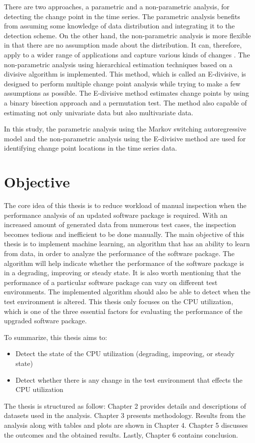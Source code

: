 There are two approaches, a parametric and a non-parametric analysis,
for detecting the change point in the time series. The parametric
analysis benefits from assuming some knowledge of data distribution
and integrating it to the detection scheme. On the other hand, the
non-parametric analysis is more flexible in that there are no assumption
made about the distribution. It can, therefore, apply to a wider range
of applications and capture various kinds of changes \citep{sharkey2014nonparametric}.
The non-parametric analysis using hierarchical estimation techniques
based on a divisive algorithm is implemented. This method, which is
called an E-divisive, is designed to perform multiple change point
analysis while trying to make a few assumptions as possible. The E-divisive
method estimates change points by using a binary bisection approach
and a permutation test. The method also capable of estimating not
only univariate data but also multivariate data. 

In this study, the parametric analysis using the Markov switching
autoregressive model and the non-parametric analysis using the E-divisive
method are used for identifying change point locations in the time
series data. 

\section{Objective \label{sec:Objective}}

The core idea of this thesis is to reduce workload of manual inspection
when the performance analysis of an updated software package is required.
With an increased amount of generated data from numerous test cases,
the inspection becomes tedious and inefficient to be done manually.
The main objective of this thesis is to implement machine learning,
an algorithm that has an ability to learn from data, in order to analyze
the performance of the software package. The algorithm will help indicate
whether the performance of the software package is in a degrading,
improving or steady state. It is also worth mentioning that the performance
of a particular software package can vary on different test environments.
The implemented algorithm should also be able to detect when the test
environment is altered. This thesis only focuses on the CPU utilization,
which is one of the three essential factors for evaluating the performance
of the upgraded software package.

To summarize, this thesis aims to:
\begin{itemize}
\item Detect the state of the CPU utilization (degrading, improving, or
steady state)
\item Detect whether there is any change in the test environment that effects
the CPU utilization
\end{itemize}
The thesis is structured as follow: Chapter 2 provides details and
descriptions of datasets used in the analysis. Chapter 3 presents
methodology. Results from the analysis along with tables and plots
are shown in Chapter 4. Chapter 5 discusses the outcomes and the obtained
results. Lastly, Chapter 6 contains conclusion.


